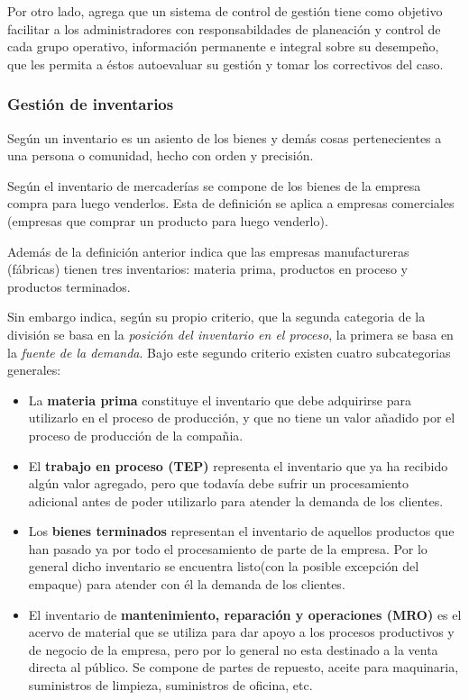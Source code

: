 Por otro lado, \cite{beltran} agrega que un sistema de control de gestión tiene
como objetivo facilitar a los administradores con responsabildades de planeación
y control de cada grupo operativo, información permanente e integral sobre su desempeño,
que les permita a éstos autoevaluar su gestión y tomar los correctivos del caso.



\subsubsection{Gestión de inventarios}
Según \cite{rae} un inventario es un asiento de los bienes y demás cosas
pertenecientes a una persona o comunidad, hecho con orden y precisión.

Según \cite{meza} el inventario de mercaderías se compone de los bienes de la
empresa compra para luego venderlos. Esta de definición se aplica a empresas
comerciales (empresas que comprar un producto para luego venderlo).

Además de la definición anterior \cite{meza} indica que las empresas manufactureras
(fábricas) tienen tres inventarios: materia prima, productos en proceso y productos
terminados.

Sin embargo \cite{chapman} indica, según su propio criterio, que la segunda categoria de la división se basa
en la \emph{posición del inventario en el proceso}, la primera se basa en la
\emph{fuente de la demanda}. Bajo este segundo criterio existen cuatro subcategorias
generales:
\begin{itemize}
  \item La \textbf{materia prima} constituye el inventario que debe adquirirse para
        utilizarlo en el proceso de producción, y que no tiene un valor añadido
        por el proceso de producción de la compañia.
  \item El \textbf{trabajo en proceso (TEP)} representa el inventario que ya ha recibido
        algún valor agregado, pero que todavía debe sufrir un procesamiento
        adicional antes de poder utilizarlo para atender la demanda de los clientes.
  \item Los \textbf{bienes terminados} representan el inventario de aquellos productos
        que han pasado ya por todo el procesamiento de parte de la empresa. Por lo general
        dicho inventario se encuentra listo(con la posible excepción del empaque)
        para atender con él la demanda de los clientes.
  \item El inventario de \textbf{mantenimiento, reparación y operaciones (MRO)}
        es el acervo de material que se utiliza para dar apoyo a los procesos productivos
        y de negocio de la empresa, pero por lo general no esta destinado a la venta
        directa al público. Se compone de partes de repuesto, aceite para maquinaria,
        suministros de limpieza, suministros de oficina, etc.
\end{itemize}

